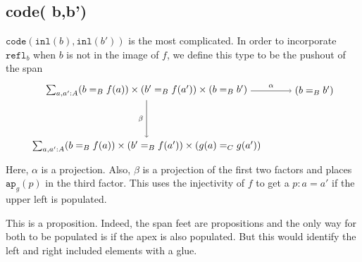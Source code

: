\documentclass[12pt]{amsart}
\newcommand{\type}[1]{\mathtt{#1}}
\newcommand{\tin}{\colon}
\newcommand{\inl}{\type{inl}}
\newcommand{\code}{\type{code}}
\theoremstyle{remark}
\theoremstyle{definition}
\begin{document}
\pagebreak
\subsection*{code( b,b')}

$\code \left( \inl ( b ) , \inl( b' ) \right)$ is the most complicated. 
In order to incorporate $\type{ refl }_b$ when $b$ is not in the image of $f$, 
we define this type to be the pushout of the span
\[
\begin{tikzpicture}
	\node (1) at (0,2) 
		{ $ \sum_{ a , a' : A } 
			( b =_B f ( a ) ) 
			\times ( b' =_B f ( a' ) ) 
			\times ( b =_B b' ) $ };
	\node (2) at (6,2) 
		{ $ ( b =_B b' ) $ };
	\node (3) at (0,0) 
		{ $ \sum_{ a , a' : A } 
			( b =_B f ( a ) ) 
			\times  (b' =_B f ( a' ) ) 
			\times ( g ( a ) =_C g ( a' ) ) $ };
	\draw [ -> ] (1) to 
		node [above] {\scriptsize $ \alpha $} 
		(2);
	\draw [ -> ] (1) to 
		node [left] {\scriptsize $ \beta $}
		(3);
\end{tikzpicture}
\]
Here, $ \alpha $ is a projection. Also,
$ \beta $ is a projection of the first
two factors and places $ \type{ ap }_g (p) $ 
in the third factor. This uses the injectivity of $f$
to get a $ p \tin a = a' $ if the upper left
is populated.

This is a proposition. 
Indeed, the span feet are propositions
and the only way for both to be populated
is if the apex is also populated.
But this would identify the 
left and right included elements
with a glue.
\end{document}
